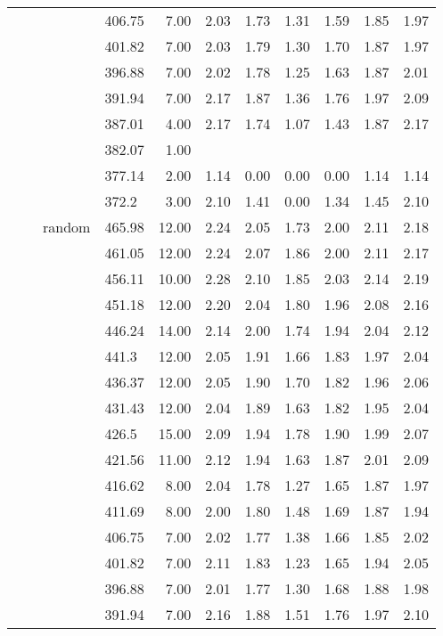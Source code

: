 \begin{longtable}{llllrrrrrrr}
   &  &  & 406.75 & 7.00 & 2.03 & 1.73 & 1.31 & 1.59 & 1.85 & 1.97 \\ 
   &  &  & 401.82 & 7.00 & 2.03 & 1.79 & 1.30 & 1.70 & 1.87 & 1.97 \\ 
   &  &  & 396.88 & 7.00 & 2.02 & 1.78 & 1.25 & 1.63 & 1.87 & 2.01 \\ 
   &  &  & 391.94 & 7.00 & 2.17 & 1.87 & 1.36 & 1.76 & 1.97 & 2.09 \\ 
   &  &  & 387.01 & 4.00 & 2.17 & 1.74 & 1.07 & 1.43 & 1.87 & 2.17 \\ 
   &  &  & 382.07 & 1.00 &  &  &  &  &  &  \\ 
   &  &  & 377.14 & 2.00 & 1.14 & 0.00 & 0.00 & 0.00 & 1.14 & 1.14 \\ 
   &  &  & 372.2 & 3.00 & 2.10 & 1.41 & 0.00 & 1.34 & 1.45 & 2.10 \\ 
   &  & random & 465.98 & 12.00 & 2.24 & 2.05 & 1.73 & 2.00 & 2.11 & 2.18 \\ 
   &  &  & 461.05 & 12.00 & 2.24 & 2.07 & 1.86 & 2.00 & 2.11 & 2.17 \\ 
   &  &  & 456.11 & 10.00 & 2.28 & 2.10 & 1.85 & 2.03 & 2.14 & 2.19 \\ 
   &  &  & 451.18 & 12.00 & 2.20 & 2.04 & 1.80 & 1.96 & 2.08 & 2.16 \\ 
   &  &  & 446.24 & 14.00 & 2.14 & 2.00 & 1.74 & 1.94 & 2.04 & 2.12 \\ 
   &  &  & 441.3 & 12.00 & 2.05 & 1.91 & 1.66 & 1.83 & 1.97 & 2.04 \\ 
   &  &  & 436.37 & 12.00 & 2.05 & 1.90 & 1.70 & 1.82 & 1.96 & 2.06 \\ 
   &  &  & 431.43 & 12.00 & 2.04 & 1.89 & 1.63 & 1.82 & 1.95 & 2.04 \\ 
   &  &  & 426.5 & 15.00 & 2.09 & 1.94 & 1.78 & 1.90 & 1.99 & 2.07 \\ 
   &  &  & 421.56 & 11.00 & 2.12 & 1.94 & 1.63 & 1.87 & 2.01 & 2.09 \\ 
   &  &  & 416.62 & 8.00 & 2.04 & 1.78 & 1.27 & 1.65 & 1.87 & 1.97 \\ 
   &  &  & 411.69 & 8.00 & 2.00 & 1.80 & 1.48 & 1.69 & 1.87 & 1.94 \\ 
   &  &  & 406.75 & 7.00 & 2.02 & 1.77 & 1.38 & 1.66 & 1.85 & 2.02 \\ 
   &  &  & 401.82 & 7.00 & 2.11 & 1.83 & 1.23 & 1.65 & 1.94 & 2.05 \\ 
   &  &  & 396.88 & 7.00 & 2.01 & 1.77 & 1.30 & 1.68 & 1.88 & 1.98 \\ 
   &  &  & 391.94 & 7.00 & 2.16 & 1.88 & 1.51 & 1.76 & 1.97 & 2.10 \\ 

\end{longtable}
